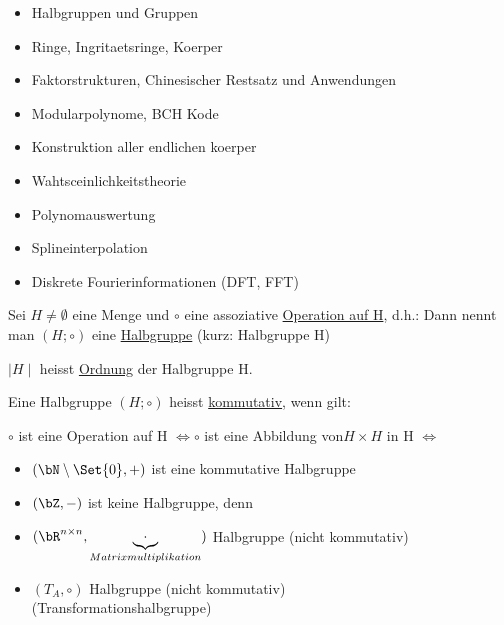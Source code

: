 \begin{itemize}
    \item Halbgruppen und Gruppen
    \item Ringe, Ingritaetsringe, Koerper
    \item Faktorstrukturen, Chinesischer Restsatz und Anwendungen
    \item Modularpolynome, BCH Kode
    \item Konstruktion aller endlichen koerper
    \item Wahtsceinlichkeitstheorie
    \item Polynomauswertung
    \item Splineinterpolation
    \item Diskrete Fourierinformationen (DFT, FFT)
\end{itemize}
Sei $H \neq \emptyset$ eine Menge und $\circ$ eine assoziative \underline{Operation auf H},
d.h.:
Dann nennt man $(H; \circ)$ eine \underline{Halbgruppe}
(kurz: Halbgruppe H)

$\mid H \mid$ heisst \underline{Ordnung} der Halbgruppe H.

Eine Halbgruppe $(H; \circ)$ heisst \underline{kommutativ}, wenn gilt:

$\circ$ ist eine Operation auf H $\iff \circ$ ist eine Abbildung von$H \times H$ in H
$\iff$
\begin{itemize}
    \item $(\bN \setminus \Set{0}, +)$ ist eine kommutative Halbgruppe
    \item $(\bZ, -)$ ist keine Halbgruppe, denn
    \item $(\bR^{n \times n},\underbrace{\cdot}_{Matrixmultiplikation})$ Halbgruppe (nicht kommutativ)
    \item $(T_A, \circ)$ Halbgruppe (nicht kommutativ)\\
    (Transformationshalbgruppe)
\end{itemize}

